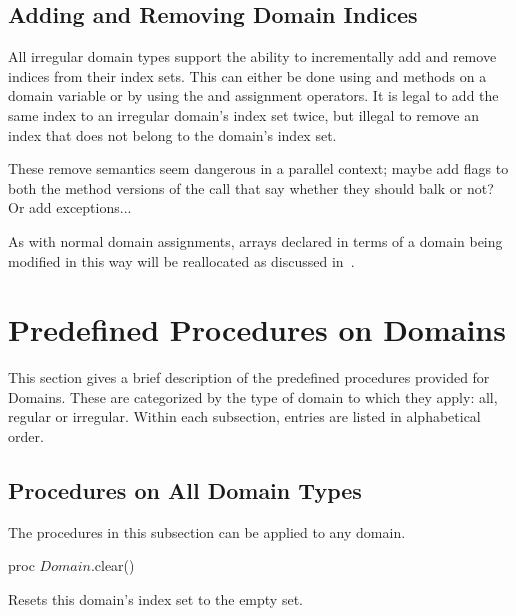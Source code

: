 \subsection{Adding and Removing Domain Indices}
\label{Adding_and_Removing_Domain_Indices}

All irregular domain types support the ability to incrementally add
and remove indices from their index sets.  This can either be done
using  and  methods on a
domain variable or by using the \chpl{+=} and \chpl{-=} assignment
operators.  It is legal to add the same index to an irregular domain's
index set twice, but illegal to remove an index that does not belong
to the domain's index set.

\begin{openissue}
These remove semantics seem dangerous in a parallel context; maybe
add flags to both the method versions of the call that say whether
they should balk or not?  Or add exceptions...
\end{openissue}

As with normal domain assignments, arrays declared in terms of a
domain being modified in this way will be reallocated as discussed
in~.


\section{Predefined Procedures on Domains}

This section gives a brief description of the predefined procedures provided for
Domains.  These are categorized by the type of domain to which they apply: all,
regular or irregular.  Within each subsection, entries are listed in
alphabetical order.

\subsection{Procedures on All Domain Types}

The procedures in this subsection can be applied to any domain.

\begin{protohead}
proc $Domain$.clear()
\end{protohead}
\begin{protobody}
Resets this domain's index set to the empty set.
\end{protobody}


